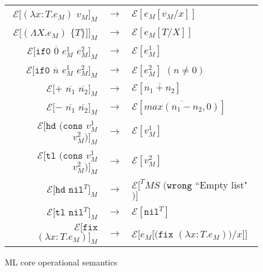 \begin{figure}
\label{mcos}
\caption{ML core operational semantics}
\begin{center}
\begin{tabular}{rcl}
$\mathscr{E}[(\lambda x:T.e_{M})$ $v_{M}]_{M}$ & $\rightarrow$ & $\mathscr{E}[e_{M}[v_{M}/x]]$ \\
$\mathscr{E}[(\Lambda X.e_{M})$ $\lbrace T\rbrace]]_{M}$ & $\rightarrow$ & $\mathscr{E}[e_{M}[T/X]]$ \\
$\mathscr{E}[\mathtt{if0}$ $\overline{0}$ $e_{M}^{1}$ $e_{M}^{2}]_{M}$ & $\rightarrow$ & $\mathscr{E}[e_{M}^{1}]$ \\
$\mathscr{E}[\mathtt{if0}$ $\overline{n}$ $e_{M}^{1}$ $e_{M}^{2}]_{M}$ & $\rightarrow$ & $\mathscr{E}[e_{M}^{2}]$ $(n\neq0)$ \\
$\mathscr{E}[+$ $\overline{n_{1}}$ $\overline{n_{2}}]_{M}$ & $\rightarrow$ & $\mathscr{E}[\overline{n_{1}+n_{2}}]$ \\
$\mathscr{E}[-$ $\overline{n_{1}}$ $\overline{n_{2}}]_{M}$ & $\rightarrow$ & $\mathscr{E}[\overline{max(n_{1}-n_{2},0)}]$ \\
$\mathscr{E}[\mathtt{hd}$ $(\mathtt{cons}$ $v_{M}^{1}$ $v_{M}^{2})]_{M}$ & $\rightarrow$ & $\mathscr{E}[v_{M}^{1}]$ \\
$\mathscr{E}[\mathtt{tl}$ $(\mathtt{cons}$ $v_{M}^{1}$ $v_{M}^{2})]_{M}$ & $\rightarrow$ & $\mathscr{E}[v_{M}^{2}]$ \\
$\mathscr{E}[\mathtt{hd}$ $\mathtt{nil}^{T}]_{M}$ & $\rightarrow$ & $\mathscr{E}[^{T}MS$ $(\mathtt{wrong}$ ``Empty list"$)]$ \\
$\mathscr{E}[\mathtt{tl}$ $\mathtt{nil}^{T}]_{M}$ & $\rightarrow$ & $\mathscr{E}[\mathtt{nil}^{T}]$ \\
$\mathscr{E}[\mathtt{fix}$ $(\lambda x:T.e_{M})]_{M}$ & $\rightarrow$ & $\mathscr{E}[e_{M}[(\mathtt{fix}$ $(\lambda x:T.e_{M}))/x]]$
\end{tabular}
\end{center}
\end{figure}